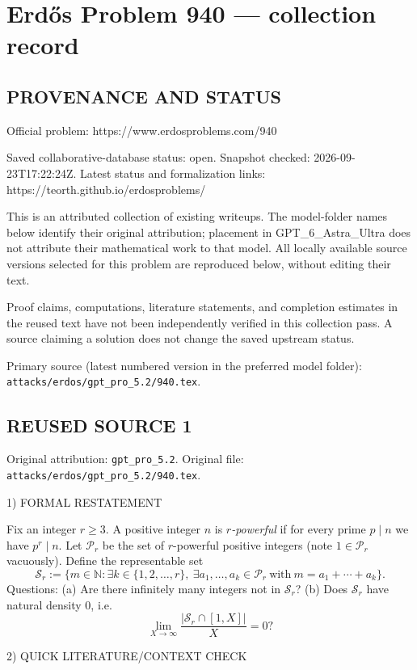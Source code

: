 \section*{Erd\H{o}s Problem 940 --- collection record}

\subsection*{PROVENANCE AND STATUS}
Official problem: https://www.erdosproblems.com/940

Saved collaborative-database status: open.
Snapshot checked: 2026-09-23T17:22:24Z.
Latest status and formalization links: https://teorth.github.io/erdosproblems/

This is an attributed collection of existing writeups. The model-folder names below identify their original attribution; placement in GPT\_6\_Astra\_Ultra does not attribute their mathematical work to that model. All locally available source versions selected for this problem are reproduced below, without editing their text.

Proof claims, computations, literature statements, and completion estimates in the reused text have not been independently verified in this collection pass. A source claiming a solution does not change the saved upstream status.

Primary source (latest numbered version in the preferred model folder): \texttt{attacks/erdos/gpt\_pro\_5.2/940.tex}.

\subsection*{REUSED SOURCE 1}
Original attribution: \texttt{gpt\_pro\_5.2}.
Original file: \texttt{attacks/erdos/gpt\_pro\_5.2/940.tex}.


1) FORMAL RESTATEMENT

Fix an integer \(r\ge 3\). A positive integer \(n\) is \emph{\(r\)-powerful} if for every prime \(p\mid n\) we have \(p^r\mid n\).
Let \(\mathcal P_r\) be the set of \(r\)-powerful positive integers (note \(1\in\mathcal P_r\) vacuously).
Define the representable set
\[\mathcal S_r := \Big\{m\in\mathbb N: \exists k\in\{1,2,\dots,r\},\ \exists a_1,\dots,a_k\in\mathcal P_r\ \text{with}\ m=a_1+\cdots+a_k\Big\}.
\]
Questions:
(a) Are there infinitely many integers not in \(\mathcal S_r\)?
(b) Does \(\mathcal S_r\) have natural density 0, i.e.
\[\lim_{X\to\infty} \frac{|\mathcal S_r\cap [1,X]|}{X}=0?\]

2) QUICK LITERATURE/CONTEXT CHECK

